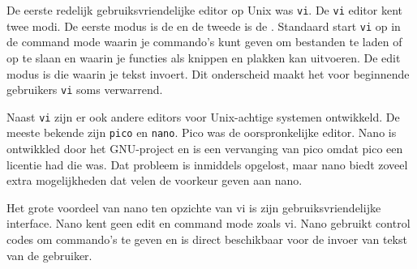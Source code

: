 De eerste redelijk gebruiksvriendelijke editor op Unix was \texttt{vi}. De \texttt{vi} editor kent twee modi. De eerste modus is de  en de tweede is de . Standaard start \texttt{vi} op in de command mode waarin je commando's kunt geven om bestanden te laden of op te slaan en waarin je functies als knippen en plakken kan uitvoeren. De edit modus is die waarin je tekst invoert. Dit onderscheid maakt het voor beginnende gebruikers \texttt{vi} soms verwarrend.

Naast \texttt{vi} zijn er ook andere editors voor Unix-achtige systemen ontwikkeld. De meeste bekende zijn \texttt{pico} en \texttt{nano}. Pico was de oorspronkelijke editor. Nano is ontwikkled door het GNU-project en is een vervanging van pico omdat pico een licentie had die  was. Dat probleem is inmiddels opgelost, maar nano biedt zoveel extra mogelijkheden dat velen de voorkeur geven aan nano.

Het grote voordeel van nano ten opzichte van vi is zijn gebruiksvriendelijke interface. Nano kent geen edit en command mode zoals vi. Nano gebruikt control codes om commando's te geven en is direct beschikbaar voor de invoer van tekst van de gebruiker.
